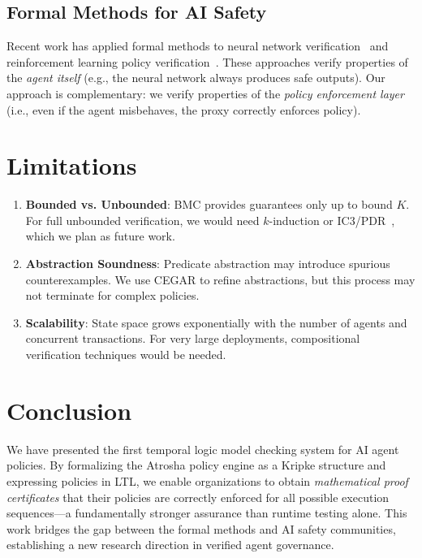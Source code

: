 \documentclass{llncs}
\begin{document}
\subsection{Formal Methods for AI Safety}

Recent work has applied formal methods to neural network verification~\cite{katz2017, mirman2024} and reinforcement learning policy verification~\cite{fulton2018}. These approaches verify properties of the \textit{agent itself} (e.g., the neural network always produces safe outputs). Our approach is complementary: we verify properties of the \textit{policy enforcement layer} (i.e., even if the agent misbehaves, the proxy correctly enforces policy).

\section{Limitations}

\begin{enumerate}
    \item \textbf{Bounded vs. Unbounded}: BMC provides guarantees only up to bound $K$. For full unbounded verification, we would need $k$-induction or IC3/PDR~\cite{bradley2011}, which we plan as future work.
    \item \textbf{Abstraction Soundness}: Predicate abstraction may introduce spurious counterexamples. We use CEGAR to refine abstractions, but this process may not terminate for complex policies.
    \item \textbf{Scalability}: State space grows exponentially with the number of agents and concurrent transactions. For very large deployments, compositional verification techniques would be needed.
\end{enumerate}

\section{Conclusion}

We have presented the first temporal logic model checking system for AI agent policies. By formalizing the Atrosha policy engine as a Kripke structure and expressing policies in LTL, we enable organizations to obtain \textit{mathematical proof certificates} that their policies are correctly enforced for all possible execution sequences---a fundamentally stronger assurance than runtime testing alone. This work bridges the gap between the formal methods and AI safety communities, establishing a new research direction in verified agent governance.
\end{document}
